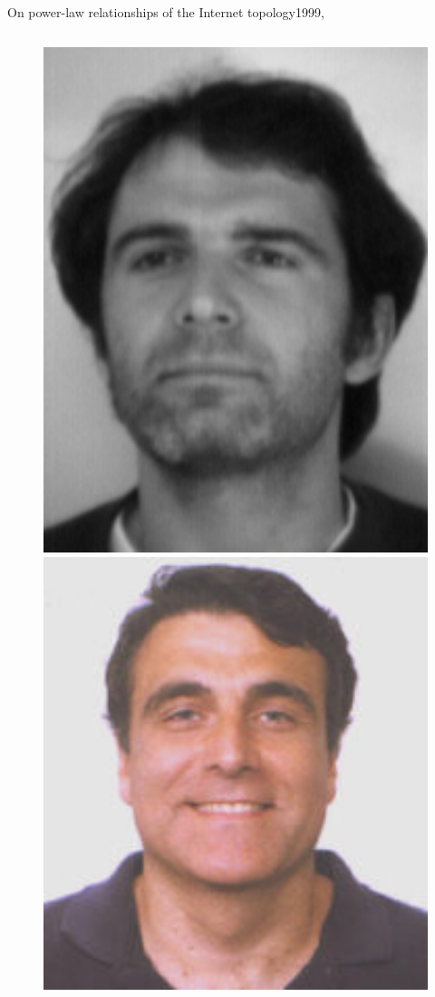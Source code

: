 \documentclass[ngerman,compress,hyperref={bookmarks}]{beamer}
\begin{document}
\begin{frame}{On power-law relationships of the Internet topology}{1999, \cite{Faloutsos:1999:PRI:316194.316229}}
\begin{columns}[c]
\begin{column}{0.1\textwidth}
\begin{figure}
        \includegraphics[width=1\textwidth]{images/faloutsos_p}\\
        \includegraphics[width=1\textwidth]{images/faloutsos_c}

\end{figure}
\end{column}
\end{columns}
\end{frame}
\end{document}
